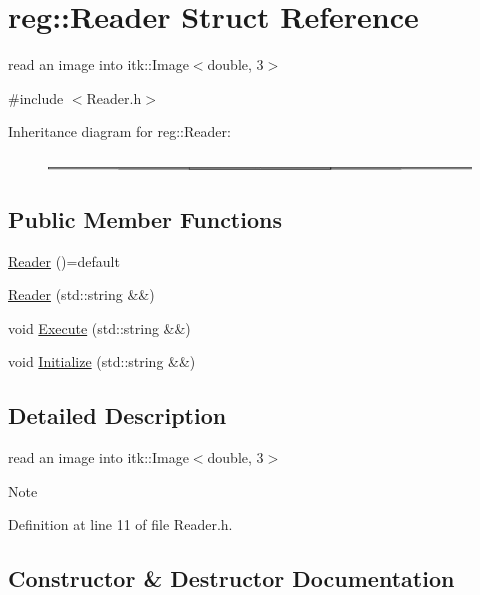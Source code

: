 \hypertarget{structreg_1_1_reader}{}\section{reg\+:\+:Reader Struct Reference}
\label{structreg_1_1_reader}


read an image into itk\+::\+Image$<$double, 3$>$  




{\ttfamily \#include $<$Reader.\+h$>$}

Inheritance diagram for reg\+:\+:Reader\+:\begin{figure}[H]
\begin{center}
\leavevmode
\includegraphics[height=0.133302cm]{structreg_1_1_reader}
\end{center}
\end{figure}
\subsection*{Public Member Functions}
\begin{DoxyCompactItemize}
\item 
\hyperlink{structreg_1_1_reader_abbb5102832a229bb96b75ec5c990b3f3}{Reader} ()=default
\item 
\hyperlink{structreg_1_1_reader_a0c69ac8185cf110c693496eb86c1a734}{Reader} (std\+::string \&\&)
\item 
void \hyperlink{structreg_1_1_reader_a5d87eae44d06ce2e055c6f3cd8b46241}{Execute} (std\+::string \&\&)
\item 
void \hyperlink{structreg_1_1_reader_ac537416d01e0f7ed72506126de45c54c}{Initialize} (std\+::string \&\&)
\end{DoxyCompactItemize}


\subsection{Detailed Description}
read an image into itk\+::\+Image$<$double, 3$>$ 

\begin{DoxyNote}{Note}

\end{DoxyNote}


Definition at line 11 of file Reader.\+h.



\subsection{Constructor \& Destructor Documentation}
\mbox{\label{structreg_1_1_reader_abbb5102832a229bb96b75ec5c990b3f3}} 
